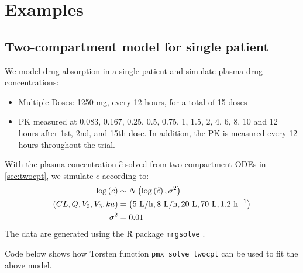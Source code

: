 \documentclass[10pt, reqno, oneside]{amsbook}
\numberwithin{equation}{chapter}
\numberwithin{figure}{chapter}
\numberwithin{table}{chapter}
\theoremstyle{remark}
\begin{document}
\chapter{Examples}
\label{sec:orgfaeeb74}
\section{Two-compartment model for single patient}
\label{sec:org171ab81}
We model drug absorption in a single patient and simulate plasma drug concentrations:

\begin{itemize}
\item Multiple Doses: 1250 mg, every 12 hours, for a total of 15 doses
\item PK measured at 0.083, 0.167, 0.25, 0.5, 0.75, 1, 1.5, 2, 4, 6,
8, 10 and 12 hours after 1st, 2nd, and 15th dose. In addition, the
PK is measured every 12 hours throughout the trial.
\end{itemize}

With the plasma concentration \(\hat{c}\) solved from
two-compartment ODEs in \ref{sec:twocpt}, we simulate \(c\) according to:
\begin{align*}
  \log\left(c\right) &\sim N\left(\log\left(\widehat{c}\right),\sigma^2\right) \\
  \left(CL, Q, V_2, V_3, ka\right) &= \left(5\ {\rm L/h}, 8\  {\rm L/h}, 20\  {\rm L},  70\ {\rm L}, 1.2\ {\rm h^{-1}} \right) \\
  \sigma^2 &= 0.01
\end{align*}
The data are generated using the R package \texttt{mrgsolve} \cite{Baron000}.

Code below shows how Torsten function \texttt{pmx\_solve\_twocpt} can be used to fit the above model.
\end{document}
